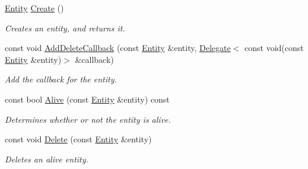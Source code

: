 \begin{DoxyCompactItemize}
\item 
\hyperlink{struct_ensum_1_1_components_1_1_entity}{Entity} \hyperlink{class_ensum_1_1_components_1_1_entity_manager_a15c2795c73d625bcc2399bf59cea64b5}{Create} ()\hypertarget{class_ensum_1_1_components_1_1_entity_manager_a15c2795c73d625bcc2399bf59cea64b5}{}\label{class_ensum_1_1_components_1_1_entity_manager_a15c2795c73d625bcc2399bf59cea64b5}

\begin{DoxyCompactList}\small\item\em Creates an entity, and returns it. \end{DoxyCompactList}\item 
const void \hyperlink{class_ensum_1_1_components_1_1_entity_manager_a87651038fca34e5dac4641c3d257c486}{Add\+Delete\+Callback} (const \hyperlink{struct_ensum_1_1_components_1_1_entity}{Entity} \&entity, \hyperlink{class_ensum_1_1_delegate}{Delegate}$<$ const void(const \hyperlink{struct_ensum_1_1_components_1_1_entity}{Entity} \&entity)$>$ \&callback)\hypertarget{class_ensum_1_1_components_1_1_entity_manager_a87651038fca34e5dac4641c3d257c486}{}\label{class_ensum_1_1_components_1_1_entity_manager_a87651038fca34e5dac4641c3d257c486}

\begin{DoxyCompactList}\small\item\em Add the callback for the entity. \end{DoxyCompactList}\item 
const bool \hyperlink{class_ensum_1_1_components_1_1_entity_manager_aa30d3768a9f92b138a52b7ac7c6045cc}{Alive} (const \hyperlink{struct_ensum_1_1_components_1_1_entity}{Entity} \&entity) const \hypertarget{class_ensum_1_1_components_1_1_entity_manager_aa30d3768a9f92b138a52b7ac7c6045cc}{}\label{class_ensum_1_1_components_1_1_entity_manager_aa30d3768a9f92b138a52b7ac7c6045cc}

\begin{DoxyCompactList}\small\item\em Determines whether or not the entity is alive. \end{DoxyCompactList}\item 
const void \hyperlink{class_ensum_1_1_components_1_1_entity_manager_aaa8e8f7e613b8b8d8b707dd80a43aec5}{Delete} (const \hyperlink{struct_ensum_1_1_components_1_1_entity}{Entity} \&entity)\hypertarget{class_ensum_1_1_components_1_1_entity_manager_aaa8e8f7e613b8b8d8b707dd80a43aec5}{}\label{class_ensum_1_1_components_1_1_entity_manager_aaa8e8f7e613b8b8d8b707dd80a43aec5}

\begin{DoxyCompactList}\small\item\em Deletes an alive entity. \end{DoxyCompactList}\end{DoxyCompactItemize}
